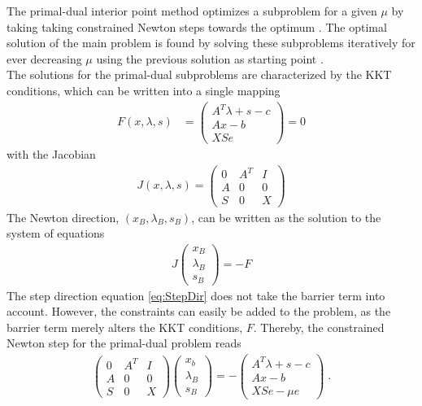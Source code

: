 The primal-dual interior point method optimizes a subproblem for a given $\mu$ by taking taking constrained Newton steps towards the optimum \cite{wright}. The optimal solution of the main problem is found by solving these subproblems iteratively for ever decreasing $\mu$ using the previous solution as starting point \cite{ipopt}.\\
The solutions for the primal-dual subproblems are characterized by the KKT conditions, which can be written into a single mapping
\begin{align}
    F(x , \lambda, s) &= \begin{pmatrix}
           A^T \lambda + s - c \\
           A x - b \\
           X S e
         \end{pmatrix} = 0
\end{align}
with the Jacobian
\begin{align}
    J(x , \lambda, s) = \begin{pmatrix}
           0 & A^T & I	\\
           A & 0 & 0 	\\
           S & 0 & X
         \end{pmatrix}
\end{align}
The Newton direction, $(x_B , \lambda_B , s_B)$, can be written as the solution to the system of equations
\begin{align}
J \begin{pmatrix}
           x_B \\
           \lambda_B \\
           s_B
         \end{pmatrix} = -F \label{eq:StepDir}
\end{align}
The step direction equation \eqref{eq:StepDir} does not take the barrier term into account. However, the constraints can easily be added to the problem, as the barrier term merely alters the KKT conditions, $F$. Thereby, the constrained Newton step for the primal-dual problem reads
\begin{align}
	\begin{pmatrix}
    	 0 & A^T & I    \\
         A & 0 & 0 		\\
         S & 0 & X
    \end{pmatrix} 
    \begin{pmatrix}
    	x_b 		    \\
        \lambda_B		\\
        s_B
    \end{pmatrix} =
    - \begin{pmatrix}
    	  A^T \lambda + s - c 	\\
          A x - b 				\\
          X S e - \mu e
    \end{pmatrix} \; . \label{eq:newtondirection}
\end{align}

